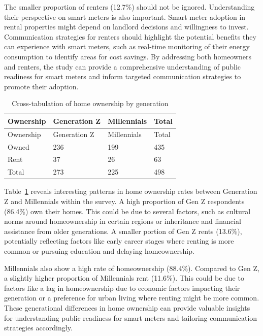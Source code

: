 \documentclass[
  letterpaper,
  DIV=11,
  numbers=noendperiod]{scrartcl}
\begin{document}
The smaller proportion of renters (12.7\%) should not be ignored.
Understanding their perspective on smart meters is also important. Smart
meter adoption in rental properties might depend on landlord decisions
and willingness to invest. Communication strategies for renters should
highlight the potential benefits they can experience with smart meters,
such as real-time monitoring of their energy consumption to identify
areas for cost savings. By addressing both homeowners and renters, the
study can provide a comprehensive understanding of public readiness for
smart meters and inform targeted communication strategies to promote
their adoption.

\begin{longtable}[]{@{}llll@{}}
\caption{Cross-tabulation of home ownership by
generation}\label{tbl-ownership-generation}\tabularnewline
\toprule\noalign{}
Ownership & Generation Z & Millennials & Total \\
\midrule\noalign{}
\endfirsthead
\toprule\noalign{}
Ownership & Generation Z & Millennials & Total \\
\midrule\noalign{}
\endhead
\bottomrule\noalign{}
\endlastfoot
Owned & 236 & 199 & 435 \\
Rent & 37 & 26 & 63 \\
Total & 273 & 225 & 498 \\
\end{longtable}

Table~\ref{tbl-ownership-generation} reveals interesting patterns in
home ownership rates between Generation Z and Millennials within the
survey. A high proportion of Gen Z respondents (86.4\%) own their homes.
This could be due to several factors, such as cultural norms around
homeownership in certain regions or inheritance and financial assistance
from older generations. A smaller portion of Gen Z rents (13.6\%),
potentially reflecting factors like early career stages where renting is
more common or pursuing education and delaying homeownership.

Millennials also show a high rate of homeownership (88.4\%). Compared to
Gen Z, a slightly higher proportion of Millennials rent (11.6\%). This
could be due to factors like a lag in homeownership due to economic
factors impacting their generation or a preference for urban living
where renting might be more common. These generational differences in
home ownership can provide valuable insights for understanding public
readiness for smart meters and tailoring communication strategies
accordingly.
\end{document}
